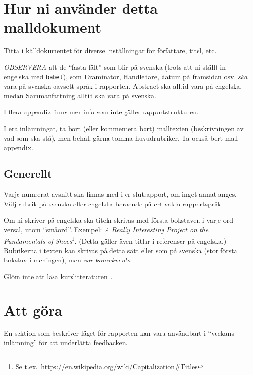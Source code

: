 \documentclass[a4paper,12pt]{article}
\begin{document}

\section*{Hur ni använder detta malldokument}
Titta i källdokumentet för diverse inställningar för författare, titel, etc.

\emph{OBSERVERA} att de ``fasta fält'' som blir på svenska (trots att ni ställt in engelska med \texttt{babel}), som Examinator, Handledare, datum på framsidan osv, \emph{ska} vara på svenska oavsett språk i rapporten. Abstract ska alltid vara på engelska, medan Sammanfattning alltid ska vara på svenska.

I flera appendix finns mer info som inte gäller rapportstrukturen.

I era inlämningar, ta bort (eller kommentera bort) malltexten (beskrivningen av vad som ska stå), men behåll gärna tomma huvudrubriker. Ta också bort mall-appendix.

\subsection*{Generellt}
Varje numrerat avsnitt ska finnas med i er slutrapport, om inget annat anges.  
Välj rubrik på svenska eller engelska beroende på ert valda rapportspråk.

Om ni skriver på engelska ska titeln skrivas med första bokstaven i varje ord versal, utom ``småord''. Exempel: \emph{A Really Interesting Project on the Fundamentals of Shoes}\footnote{Se t.ex.~\url{https://en.wikipedia.org/wiki/Capitalization\#Titles}}.  (Detta gäller även titlar i referenser på engelska.)
Rubrikerna i texten kan skrivas på detta sätt eller som på svenska (stor första bokstav i meningen), men \emph{var konsekventa}.

Glöm inte att läsa kurslitteraturen~\cite{dawson:projects-in-computing,dawson:projects-in-computing-old}.




\section*{Att göra}
En sektion som beskriver läget för rapporten kan vara användbart i ``veckans inlämning'' för att underlätta feedbacken.
\end{document}
